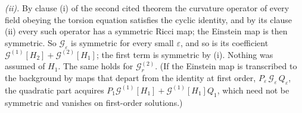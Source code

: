 \emph{(ii).} By clause (i) of the second cited theorem the curvature operator of every field obeying the torsion equation satisfies the cyclic identity, and by its clause (ii) every such operator has a symmetric Ricci map; the Einstein map is then symmetric. So $\mathcal{G}_{\varepsilon}$ is symmetric for every small $\varepsilon$, and so is its coefficient $\mathcal{G}^{(1)}[H_{2}] + \mathcal{G}^{(2)}[H_{1}]$; the first term is symmetric by (i). Nothing was assumed of $H_{1}$. The same holds for $\mathcal{G}^{(2)}_{r}$. (If the Einstein map is transcribed to the background by maps that depart from the identity at first order, $P_{\varepsilon}\,\mathcal{G}_{\varepsilon}\,Q_{\varepsilon}$, the quadratic part acquires $P_{1}\mathcal{G}^{(1)}[H_{1}] + \mathcal{G}^{(1)}[H_{1}]Q_{1}$, which need not be symmetric and vanishes on first-order solutions.)

